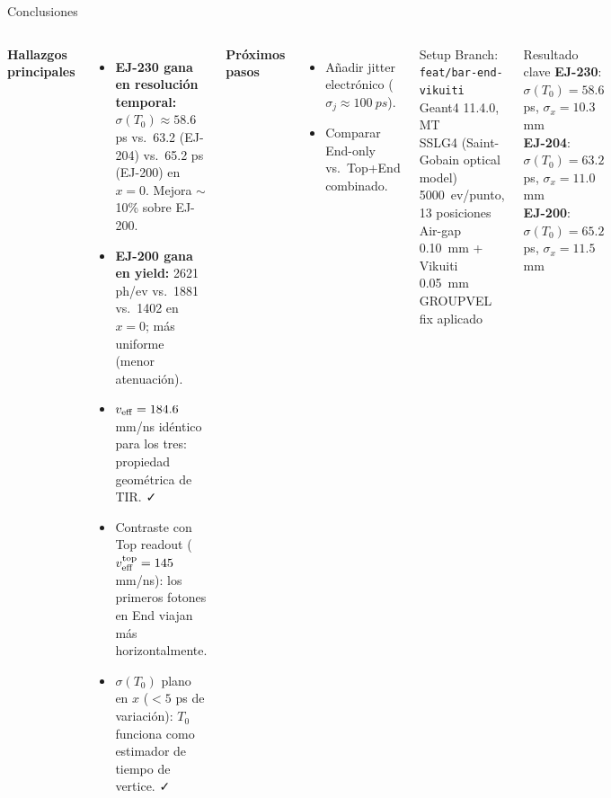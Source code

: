 \documentclass[aspectratio=169,9pt]{beamer}
\begin{document}
\begin{frame}{Conclusiones}
  \begin{columns}[T]
    \textbf{Hallazgos principales}
    \begin{itemize}
      \item \textbf{EJ-230 gana en resolución temporal:}
            $\sigma(T_0) \approx 58.6$ ps vs.\ 63.2 (EJ-204) vs.\ 65.2 ps (EJ-200)
            en $x=0$. Mejora $\sim$10\% sobre EJ-200.
      \item \textbf{EJ-200 gana en yield:}
            2621 ph/ev vs.\ 1881 vs.\ 1402 en $x=0$;
            más uniforme (menor atenuación).
      \item $v_{\rm eff} = 184.6$ mm/ns idéntico para los tres:
            propiedad geométrica de TIR. ✓
      \item Contraste con Top readout ($v_{\rm eff}^{\rm top}=145$ mm/ns):
            los primeros fotones en End viajan más horizontalmente.
      \item $\sigma(T_0)$ plano en $x$ ($<5$ ps de variación): $T_0$
            funciona como estimador de tiempo de vertice. ✓
    \end{itemize}
    \vspace{0.3em}
    \textbf{Próximos pasos}
    \begin{itemize}
      \item Añadir jitter electrónico ($\sigma_j \approx \SI{100}{ps}$).
      \item Comparar End-only vs.\ Top+End combinado.
    \end{itemize}

    \begin{block}{Setup}
      Branch: \texttt{feat/bar-end-vikuiti}\\
      Geant4 11.4.0, MT\\
      SSLG4 (Saint-Gobain optical model)\\
      \SI{5000}{ev/punto}, 13 posiciones\\
      Air-gap \SI{0.10}{mm} + Vikuiti \SI{0.05}{mm}\\
      GROUPVEL fix aplicado
    \end{block}
    \begin{block}{Resultado clave}
      \textbf{EJ-230}: $\sigma(T_0) = 58.6$ ps, $\sigma_x = 10.3$ mm\\
      \textbf{EJ-204}: $\sigma(T_0) = 63.2$ ps, $\sigma_x = 11.0$ mm\\
      \textbf{EJ-200}: $\sigma(T_0) = 65.2$ ps, $\sigma_x = 11.5$ mm
    \end{block}
  \end{columns}
\end{frame}
\end{document}

